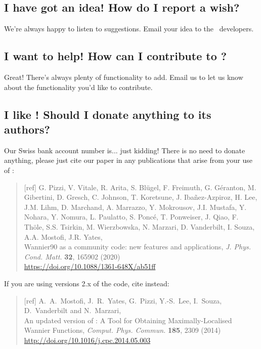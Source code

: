 \subsection{I have got an idea! How do I report a wish?}

We're always happy to listen to suggestions. Email your idea to the
  \wannier\ developers.

\subsection{I want to help! How can I contribute to \wannier?}

Great! There's always plenty of functionality to add. Email us 
to let us know about the functionality you'd like to contribute. 

\subsection{I like \wannier! Should I donate anything to its authors?}

Our Swiss bank account number is... just kidding! There is no need to
donate anything, please just cite our paper in any publications that
arise from your use of \wannier:

\begin{quote}
[ref] G. Pizzi, V. Vitale, R. Arita, S. Bl\"ugel, F. Freimuth, G. G\'eranton, 
   M. Gibertini, D. Gresch, C. Johnson, T. Koretsune, J. Iba\~nez-Azpiroz, 
   H. Lee, J.M. Lihm, D. Marchand, A. Marrazzo, Y. Mokrousov, J.I. Mustafa, 
   Y. Nohara, Y. Nomura, L. Paulatto, S. Ponc\'e, T. Ponweiser, J. Qiao, 
   F. Th\"ole, S.S. Tsirkin, M. Wierzbowska, N. Marzari, D. Vanderbilt, 
   I. Souza, A.A. Mostofi, J.R. Yates,\\
   Wannier90 as a community code: new features and 
  applications, \emph{J. Phys. Cond. Matt.} {\bf 32}, 165902 (2020)\\
  \url{https://doi.org/10.1088/1361-648X/ab51ff}
\end{quote}

If you are using versions 2.x of the code, cite instead:

\begin{quote}
[ref] A.~A.~Mostofi, J.~R.~Yates, G.~Pizzi, Y.-S.~Lee, I.~Souza, D.~Vanderbilt
and N.~Marzari,\\
An updated version of \wannier: 
A Tool for Obtaining Maximally-Localised Wannier
  Functions, {\it Comput. Phys. Commun.} {\bf 185}, 2309 (2014)\\
\url{http://doi.org/10.1016/j.cpc.2014.05.003}
\end{quote} 

